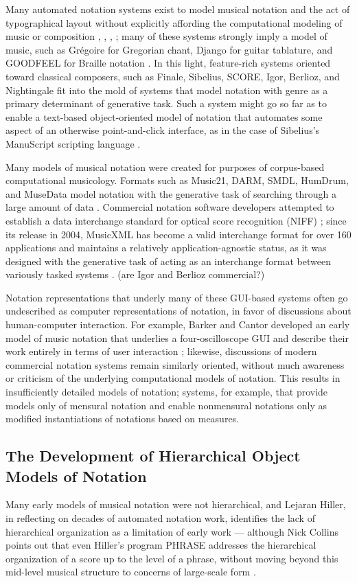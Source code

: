 Many automated notation systems exist to model musical notation and the act of typographical layout without explicitly affording the computational modeling of music or composition \cite{Smith:1972mw}, \cite{Nienhuys:2003ve}, \cite{Hoos:1998bd}, \cite{hamel1noteability}; many of these systems strongly imply a model of music, such as Gr\'{e}goire for Gregorian chant, Django for guitar tablature, and GOODFEEL for Braille notation \cite{2006}. In this light, feature-rich systems oriented toward classical composers, such as Finale, Sibelius, SCORE, Igor, Berlioz, and Nightingale fit into the mold of systems that model notation with genre as a primary determinant of generative task. Such a system might go so far as to enable a text-based object-oriented model of notation that automates some aspect of an otherwise point-and-click interface, as in the case of Sibelius's ManuScript scripting language \cite{Technology:qc}. 

Many models of musical notation were created for purposes of corpus-based computational musicology. Formats such as Music21, DARM, SMDL, HumDrum, and MuseData model notation with the generative task of searching through a large amount of data \cite{Selfridge-Field:1997ud}. Commercial notation software developers attempted to establish a data interchange standard for optical score recognition (NIFF) \cite{niff1995niff}; since its release in 2004, MusicXML has become a valid interchange format for over 160 applications and maintains a relatively application-agnostic status, as it was designed with the generative task of acting as an interchange format between variously tasked systems \cite{Good:2001if}. (are Igor and Berlioz commercial?)

Notation representations that underly many of these GUI-based systems often go undescribed as computer representations of notation, in favor of discussions about human-computer interaction. For example, Barker and Cantor developed an early model of music notation that underlies a four-oscilloscope GUI and describe their work entirely in terms of user interaction \cite{cantor1971computer}; likewise, discussions of modern commercial notation systems remain similarly oriented, without much awareness or criticism of the underlying computational models of notation. This results in insufficiently detailed models of notation; systems, for example, that provide models only of mensural notation and enable nonmensural notations only as modified instantiations of notations based on measures.

\subsection{The Development of Hierarchical Object Models of Notation}
Many early models of musical notation were not hierarchical, and Lejaran Hiller, in reflecting on decades of automated notation work, identifies the lack of hierarchical organization as a limitation of early work --- although Nick Collins points out that even Hiller's program PHRASE addresses the hierarchical organization of a score up to the level of a phrase, without moving beyond this mid-level musical structure to concerns of large-scale form \cite[108]{Collins2009}. 

